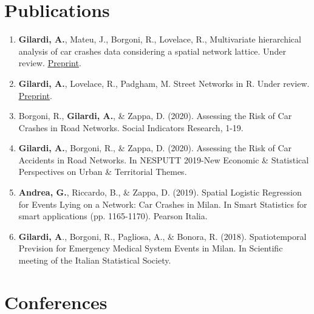 \documentclass[11pt,a4paper,sans]{moderncv}
\begin{document}
	\section{Publications}
	\begin{enumerate}
		\item \textbf{Gilardi, A.}, Mateu, J., Borgoni, R., Lovelace, R., Multivariate hierarchical analysis of car crashes data considering a spatial network lattice. Under review. \underline{\href{https://arxiv.org/abs/2011.12595}{Preprint}}.  
		\item \textbf{Gilardi, A.}, Lovelace, R., Padgham, M. Street Networks in R. Under review. \underline{\href{https://osf.io/78yub}{Preprint}}.
		\item Borgoni, R., \textbf{Gilardi, A.}, \& Zappa, D. (2020). Assessing the Risk of Car Crashes in Road Networks. Social Indicators Research, 1-19.
		\item \textbf{Gilardi, A.}, Borgoni, R., \& Zappa, D. (2020). Assessing the Risk of Car Accidents in Road Networks. In NESPUTT 2019-New Economic \& Statistical Perspectives on Urban \& Territorial Themes.
		\item \textbf{Andrea, G.}, Riccardo, B., \& Zappa, D. (2019). Spatial Logistic Regression for Events Lying on a Network: Car Crashes in Milan. In Smart Statistics for smart applications (pp. 1165-1170). Pearson Italia.
		\item \textbf{Gilardi, A}., Borgoni, R., Pagliosa, A., \& Bonora, R. (2018). Spatiotemporal Prevision for Emergency Medical System Events in Milan. In Scientific meeting of the Italian Statistical Society.
	\end{enumerate}

	\section{Conferences}
	
\end{document}
